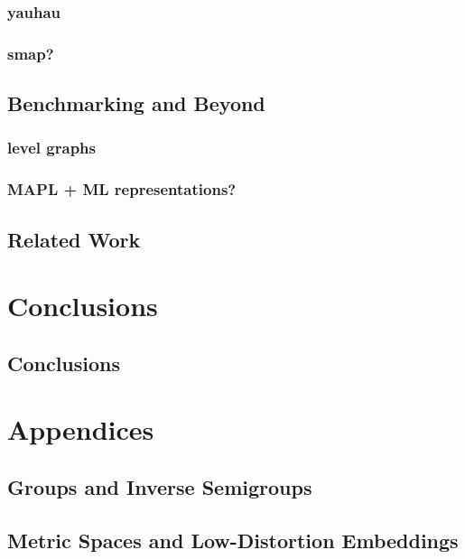 \documentclass{report}
\begin{document}
\section{yauhau}
\section{smap?}



\chapter{Benchmarking and Beyond}

\section{level graphs}
\section{MAPL + ML representations?}

\chapter{Related Work}


\part{Conclusions}
\chapter{Conclusions} 

\part{Appendices}
\appendix

\chapter{Groups and Inverse Semigroups}
\label{appendix:groups}

\chapter{Metric Spaces and Low-Distortion Embeddings}
\label{appendix:metric}

\end{document}
